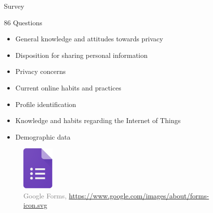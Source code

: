 \documentclass[xcolor={svgnames},compress,aspectratio=169]{beamer}
\begin{document}
\begin{frame}[shrink]{Survey}
    \begin{multicols}{2}
        86 Questions
        \begin{itemize}
            \item General knowledge and attitudes towards privacy
            \item Disposition for sharing personal information
            \item Privacy concerns
            \item Current online habits and practices
            \item Profile identification
            \item Knowledge and habits regarding the Internet of Things
            \item Demographic data
        \end{itemize}

        \columnbreak
        \vspace*{\fill}
        \begin{figure}
            \centering\includegraphics[width=45pt]{assets/images/forms.png}\\
            \textcolor{gray}{{\tiny Google Forms, \href{https://www.google.com/images/about/forms-icon.svg}{https://www.google.com/images/about/forms-icon.svg}}}
        \end{figure}
        \vspace*{\fill}
    \end{multicols}
\end{frame}

\end{document}
